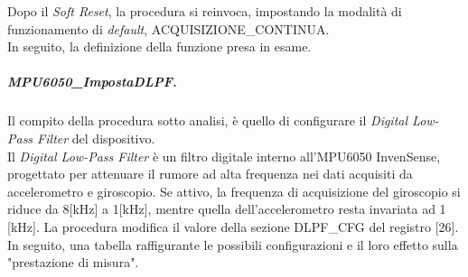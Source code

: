 Dopo il \textit{Soft Reset}, la procedura si reinvoca, impostando la modalità di funzionamento di \textit{default}, ACQUISIZIONE\_CONTINUA.\\
In seguito, la definizione della funzione presa in esame.

\subparagraph{MPU6050\_ImpostaDLPF.} 
Il compito della procedura sotto analisi, è quello di configurare il \textit{Digital Low-Pass Filter} del dispositivo.\\
Il \textit{Digital Low-Pass Filter} è un filtro digitale interno all'MPU6050 InvenSense, progettato per attenuare il rumore ad alta frequenza nei dati acquisiti da accelerometro e giroscopio.
Se attivo, la frequenza di acquisizione del giroscopio si riduce da 8[kHz] a 1[kHz], mentre quella dell'accelerometro resta invariata ad 1 [kHz].
La procedura modifica il valore della sezione DLPF\_CFG del registro [26]. In seguito, una tabella raffigurante le possibili configurazioni e il loro effetto sulla "prestazione di misura".
\begin{table}[H]
    \centering
    \caption{Le possibili configurazioni opzionabili del \textit{Digital Low-Pass Filter}.}
    \label{tab: tabella}
\end{table}


